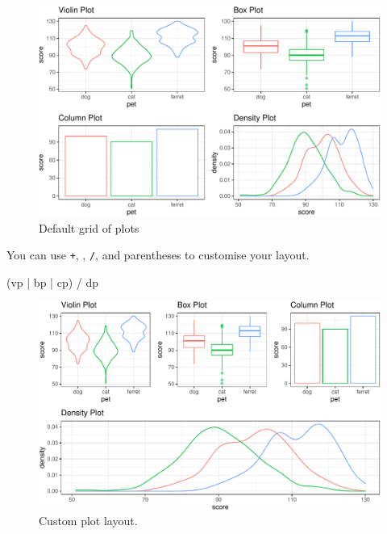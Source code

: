 \documentclass[
  oneside]{book}
\newenvironment{Shaded}{\begin{snugshade}}{\end{snugshade}}
\newcommand{\NormalTok}[1]{#1}
\newcommand{\SpecialCharTok}[1]{\textcolor[rgb]{0.00,0.00,0.00}{#1}}
\begin{document}
\begin{figure}

{\centering \includegraphics[width=0.9\linewidth]{images/patchwork-add-1} 

}

\caption{Default grid of plots}\label{fig:patchwork-add}
\end{figure}

You can use \texttt{+}, \texttt{\textbar{}}, \texttt{/}, and parentheses to customise your layout.

\begin{Shaded}
\begin{Highlighting}[]
\NormalTok{(vp }\SpecialCharTok{|}\NormalTok{ bp }\SpecialCharTok{|}\NormalTok{ cp) }\SpecialCharTok{/}\NormalTok{ dp}
\end{Highlighting}
\end{Shaded}

\begin{figure}

{\centering \includegraphics[width=0.9\linewidth]{images/patchwork-layout-1} 

}

\caption{Custom plot layout.}\label{fig:patchwork-layout}
\end{figure}
\end{document}
